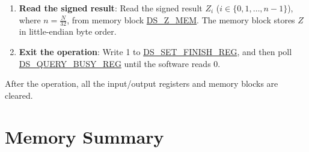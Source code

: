 \documentclass[main\_\_EN.tex]{subfiles}
\begin{document}
\begin{enumerate}
\begin{itemize}
        \item If the value is 2, it indicates that the padding check fails but the MD check passes. Users can continue to get the signed result \begin{math}Z\end{math}. But please note that the data does not comply with the aforementioned PKCS\#7 padding format, which may not be what you want.

        \item If the value is 3, it indicates that both the padding check and MD check fail. In this case, some fatal errors have occurred and the signed result \begin{math}Z\end{math} is invalid. The operation will resume directly from Step \ref{other:digsig-step-exit}.

    \end{itemize}

    \item {\bfseries Read the signed result}: Read the signed result \begin{math}Z_{i}\end{math} (\begin{math}i \in \{0,1,\dots,n-1\}\end{math}), where \begin{math} n = \frac{N}{32} \end{math}, from memory block \hyperref[DSZMEM]{DS\_Z\_MEM}. The memory block stores \begin{math}Z\end{math} in little-endian byte order.

    \item {\bfseries Exit the operation\label{other:digsig-step-exit}}: Write 1 to \hyperref[regdesc:DSSETFINISHREG]{DS\_SET\_FINISH\_REG}, and then poll \hyperref[regdesc:DSQUERYBUSYREG]{DS\_QUERY\_BUSY\_REG} until the software reads 0.

\end{enumerate}

After the operation, all the input/output registers and memory blocks are cleared.


\clearpage
\section{Memory Summary}
\label{sec:digsig-mem-summ}
\end{document}
